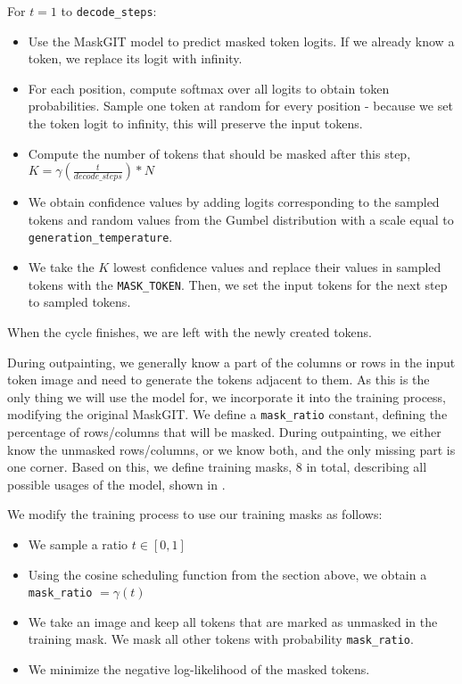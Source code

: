 For $t = 1$ to \texttt{decode\_steps}:
\begin{itemize}
\item Use the MaskGIT model to predict masked token logits. If we already know a token, we replace its logit with infinity.
\item For each position, compute softmax over all logits to obtain token probabilities. Sample one token at random for every position - because we set the token logit to infinity, this will preserve the input tokens.
\item Compute the number of tokens that should be masked after this step, $K=\gamma(\frac{t}{decode\_steps}) * N$
\item We obtain confidence values by adding logits corresponding to the sampled tokens and random values from the Gumbel distribution with a scale equal to \texttt{generation\_temperature}.
\item We take the $K$ lowest confidence values and replace their values in sampled tokens with the \texttt{MASK\_TOKEN}. Then, we set the input tokens for the next step to sampled tokens.
\end{itemize}

When the cycle finishes, we are left with the newly created tokens.

During outpainting, we generally know a part of the columns or rows in the input token image and need to generate the tokens adjacent to them. As this is the only thing we will use the model for, we incorporate it into the training process, modifying the original MaskGIT. We define a \texttt{mask\_ratio} constant, defining the percentage of rows/columns that will be masked. During outpainting, we either know the unmasked rows/columns, or we know both, and the only missing part is one corner. Based on this, we define training masks, 8 in total, describing all possible usages of the model, shown in .



We modify the training process to use our training masks as follows:

\begin{itemize}
\item We sample a ratio $t \in [0, 1]$
\item Using the cosine scheduling function from the section above, we obtain a \texttt{mask\_ratio} $= \gamma(t)$
\item We take an image and keep all tokens that are marked as unmasked in the training mask. We mask all other tokens with probability \texttt{mask\_ratio}.
\item We minimize the negative log-likelihood of the masked tokens.
\end{itemize}




